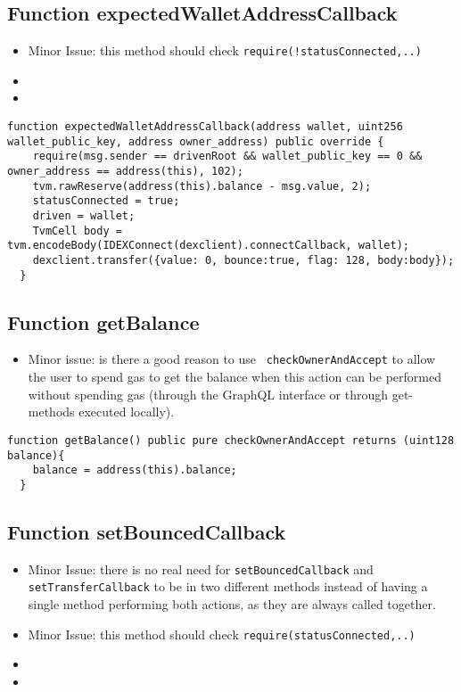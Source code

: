 \subsection{Function expectedWalletAddressCallback}

\begin{itemize}
\item Minor Issue: this method should check {\tt require(!statusConnected,..)}
\item \issueError{}
\item \issueEncodeBody{}
\end{itemize}

\begin{lstlisting}[firstnumber=77]
  function expectedWalletAddressCallback(address wallet, uint256 wallet_public_key, address owner_address) public override {
    require(msg.sender == drivenRoot && wallet_public_key == 0 && owner_address == address(this), 102);
    tvm.rawReserve(address(this).balance - msg.value, 2);
    statusConnected = true;
    driven = wallet;
    TvmCell body = tvm.encodeBody(IDEXConnect(dexclient).connectCallback, wallet);
    dexclient.transfer({value: 0, bounce:true, flag: 128, body:body});
  }
\end{lstlisting}

\subsection{Function getBalance}

\begin{itemize}
\item Minor issue: is there a good reason to use {\tt
  checkOwnerAndAccept} to allow the user to spend gas to get the
  balance when this action can be performed without spending gas
  (through the GraphQL interface or through get-methods executed
  locally).
\end{itemize}

\begin{lstlisting}[firstnumber=124]
  function getBalance() public pure checkOwnerAndAccept returns (uint128 balance){
    balance = address(this).balance;
  }
\end{lstlisting}

\subsection{Function setBouncedCallback}

\begin{itemize}
\item Minor Issue: there is no real need for {\tt setBouncedCallback}
  and {\tt setTransferCallback} to be in two different methods instead
  of having a single method performing both actions, as they are
  always called together.
\item Minor Issue: this method should check {\tt require(statusConnected,..)}
\item \issueError{}
\item \issueEncodeBody{}
\end{itemize}

